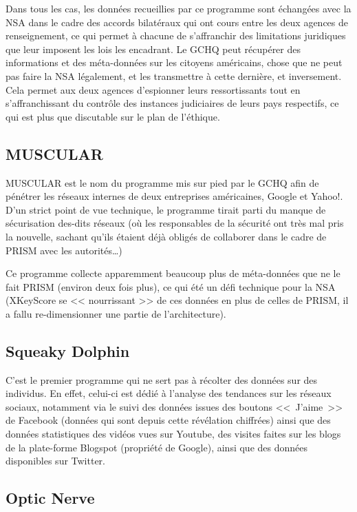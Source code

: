 Dans tous les cas, les données recueillies par ce programme sont
échangées avec la NSA dans le cadre des accords bilatéraux qui ont cours entre
les deux agences de renseignement, ce qui permet à chacune de s'affranchir des
limitations juridiques que leur imposent les lois les encadrant. Le GCHQ peut
récupérer des informations et des méta-données sur les citoyens américains,
chose que ne peut pas faire la NSA légalement, et les transmettre à cette
dernière, et inversement\citep{echange}. Cela permet aux deux agences d'espionner
leurs ressortissants tout en s'affranchissant du contrôle des instances
judiciaires de leurs pays respectifs, ce qui est plus que discutable sur le plan
de l'éthique.

\subsection{MUSCULAR}

MUSCULAR est le nom du programme mis sur pied par le GCHQ afin de
pénétrer les réseaux internes de deux entreprises américaines, Google et Yahoo!.
D'un strict point de vue technique, le programme tirait parti du manque de
sécurisation des-dits réseaux\citep{echange}\citep{Yahoo} (où les responsables de
la sécurité ont très mal pris la nouvelle, sachant qu'ils étaient déjà obligés de collaborer
dans le cadre de PRISM avec les autorités\ldots)

Ce programme collecte apparemment beaucoup plus de méta-données que
ne le fait PRISM (environ deux fois plus\citep{echange}), ce qui été un défi
technique pour la NSA (XKeyScore se << nourrissant >> de ces données en plus de
celles de PRISM, il a fallu re-dimensionner une partie de l'architecture).

\subsection{Squeaky Dolphin}

C'est le premier programme qui ne sert pas à récolter des données
sur des individus. En effet, celui-ci est dédié à l'analyse des tendances sur
les réseaux sociaux, notamment via le suivi des données issues des boutons
<<~J'aime~>> de Facebook (données qui sont depuis cette révélation
chiffrées\citep{fbenc}) ainsi que des données statistiques des vidéos vues sur
Youtube, des visites faites sur les blogs de la plate-forme Blogspot (propriété
de Google), ainsi que des données disponibles sur Twitter.

\subsection{Optic Nerve}

